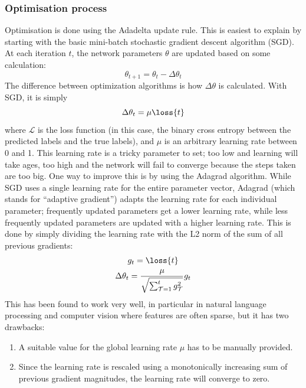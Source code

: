 \subsubsection{Optimisation process}\label{sec:optim}
Optimisation is done using the Adadelta update rule\citep{adadelta}. This is
easiest to explain by starting with the basic mini-batch stochastic gradient
descent algorithm (SGD). At each iteration $t$, the network parameters $\theta$
are updated based on some calculation:
\begin{equation}
  \theta_{t+1} = \theta_{t} - \Delta\theta_t
\end{equation}
The difference between optimization algorithms is how $\Delta\theta$ is
calculated. With SGD, it is simply
\begin{equation}
  \Delta\theta_t = \mu \loss{t}
\end{equation}
where $\mathcal{L}$ is the loss function (in this case, the binary cross entropy
between the predicted labels and the true labels), and $\mu$ is an arbitrary
learning rate between 0 and 1. This learning rate is a tricky parameter to set;
too low and learning will take ages, too high and the network will fail to
converge because the steps taken are too big. One way to improve this is by
using the Adagrad\citep{adagrad} algorithm. While SGD uses a single learning
rate for the entire parameter vector, Adagrad (which stands for ``adaptive
gradient'') adapts the learning rate for each individual parameter; frequently
updated parameters get a lower learning rate, while less frequently updated
parameters are updated with a higher learning rate. This is done by simply
dividing the learning rate with the L2 norm of the sum of all previous gradients:
\begin{gather}
  g_{t} = \loss{t} \\
  \Delta\theta_t = \frac{\mu}{\sqrt{\sum^{t}_{\mathcal{T}=1}g_{\mathcal{T}}^2}} g_{t}
\end{gather}
This has been found to work very well, in particular in natural language
processing and computer vision where features are often sparse, but it has two
drawbacks:
\begin{enumerate}
  \item A suitable value for the global learning rate $\mu$ has to be
    manually provided.
  \item Since the learning rate is rescaled using a monotonically increasing sum of
    previous gradient magnitudes, the learning rate will converge to zero.
\end{enumerate}
